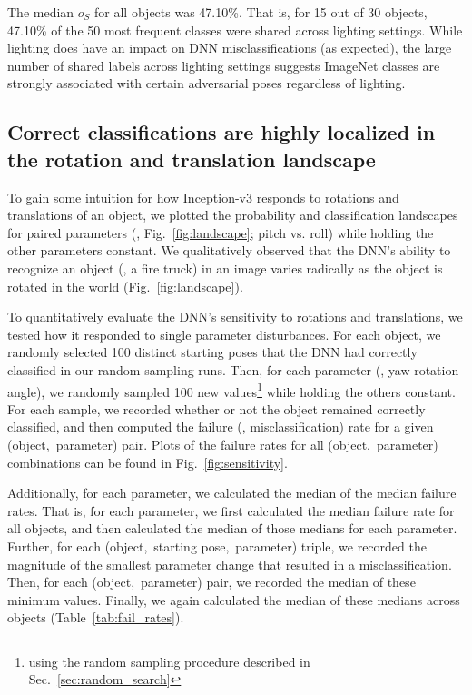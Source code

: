 \documentclass[10pt,twocolumn,letterpaper]{article}
\newcommand{\subsec}[1]{\noindent{\textbf{#1.}}}
\begin{document}
\noindent
The median $o_{S}$ for all objects was 47.10\%.
That is, for 15 out of 30 objects, 47.10\% of the 50 most frequent classes were shared across lighting settings.
While lighting does have an impact on DNN misclassifications (as expected), the large number of shared labels across lighting settings suggests ImageNet classes are strongly associated with certain adversarial poses regardless of lighting.

\subsection{Correct classifications are highly localized in the rotation and translation landscape}
\label{sec:landscape}

To gain some intuition for how Inception-v3 responds to rotations and translations of an object, we plotted the probability and classification landscapes for paired parameters (\eg, Fig.~\ref{fig:landscape}; pitch vs. roll) while holding the other parameters constant.
We qualitatively observed that the DNN's ability to recognize an object (\eg, a fire truck) in an image varies radically as the object is rotated in the world (Fig.~\ref{fig:landscape}).


\subsec{Experiment}
To quantitatively evaluate the DNN's sensitivity to rotations and translations, we tested how it responded to single parameter disturbances.
For each object, we randomly selected 100 distinct starting poses that the DNN had correctly classified in our random sampling runs.
Then, for each parameter (\eg, yaw rotation angle), we randomly sampled 100 new values\footnote{\label{note:sampling}using the random sampling procedure described in Sec.~\ref{sec:random_search}} while holding the others constant.
For each sample, we recorded whether or not the object remained correctly classified, and then computed the failure (\ie, misclassification) rate for a given (object,~parameter) pair.
Plots of the failure rates for all (object,~parameter) combinations can be found in Fig.~\ref{fig:sensitivity}.

Additionally, for each parameter, we calculated the median of the median failure rates.
That is, for each parameter, we first calculated the median failure rate for all objects, and then calculated the median of those medians for each parameter.
Further, for each (object,~starting pose,~parameter) triple, we recorded the magnitude of the smallest parameter change that resulted in a misclassification.
Then, for each (object,~parameter) pair, we recorded the median of these minimum values.
Finally, we again calculated the median of these medians across objects (Table~\ref{tab:fail_rates}).
\end{document}
